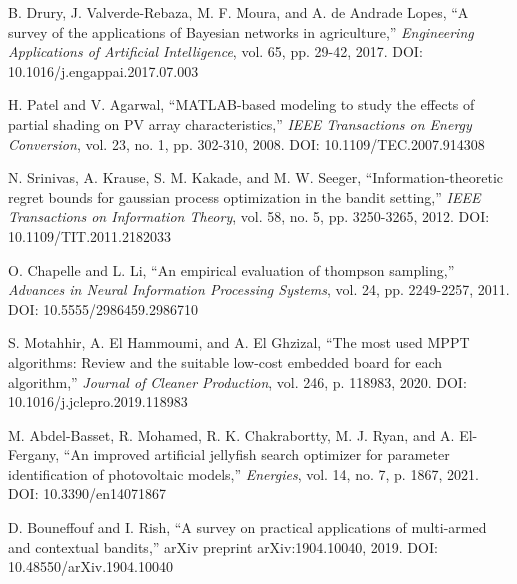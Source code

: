\documentclass[conference]{IEEEtran}
\begin{document}
\begin{thebibliography}{00}
 B. Drury, J. Valverde-Rebaza, M. F. Moura, and A. de Andrade Lopes, ``A survey of the applications of Bayesian networks in agriculture,'' \emph{Engineering Applications of Artificial Intelligence}, vol. 65, pp. 29-42, 2017. DOI: 10.1016/j.engappai.2017.07.003

 H. Patel and V. Agarwal, ``MATLAB-based modeling to study the effects of partial shading on PV array characteristics,'' \emph{IEEE Transactions on Energy Conversion}, vol. 23, no. 1, pp. 302-310, 2008. DOI: 10.1109/TEC.2007.914308

 N. Srinivas, A. Krause, S. M. Kakade, and M. W. Seeger, ``Information-theoretic regret bounds for gaussian process optimization in the bandit setting,'' \emph{IEEE Transactions on Information Theory}, vol. 58, no. 5, pp. 3250-3265, 2012. DOI: 10.1109/TIT.2011.2182033

 O. Chapelle and L. Li, ``An empirical evaluation of thompson sampling,'' \emph{Advances in Neural Information Processing Systems}, vol. 24, pp. 2249-2257, 2011. DOI: 10.5555/2986459.2986710

 S. Motahhir, A. El Hammoumi, and A. El Ghzizal, ``The most used MPPT algorithms: Review and the suitable low-cost embedded board for each algorithm,'' \emph{Journal of Cleaner Production}, vol. 246, p. 118983, 2020. DOI: 10.1016/j.jclepro.2019.118983

 M. Abdel-Basset, R. Mohamed, R. K. Chakrabortty, M. J. Ryan, and A. El-Fergany, ``An improved artificial jellyfish search optimizer for parameter identification of photovoltaic models,'' \emph{Energies}, vol. 14, no. 7, p. 1867, 2021. DOI: 10.3390/en14071867

 D. Bouneffouf and I. Rish, ``A survey on practical applications of multi-armed and contextual bandits,'' arXiv preprint arXiv:1904.10040, 2019. DOI: 10.48550/arXiv.1904.10040

\end{thebibliography}
\end{document}
